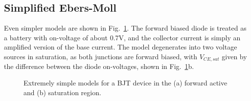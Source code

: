 \subsection{Simplified Ebers-Moll}
Even simpler models are shown in Fig.~\ref{fig:slide19}. The forward biased diode is treated as a battery with on-voltage of about 0.7V, and the collector current is simply an amplified version of the base current.  The model degenerates into two voltage sources in saturation, as both junctions are forward biased, with $V_{CE,sat}$ given by the difference between the diode on-voltages, shown in Fig.~\ref{fig:slide19}b.
\begin{figure}[tb]
\centering
{}
\caption{Extremely simple models for a BJT device in the (a) forward active and (b) saturation region.} \label{fig:slide19}
\end{figure} 
